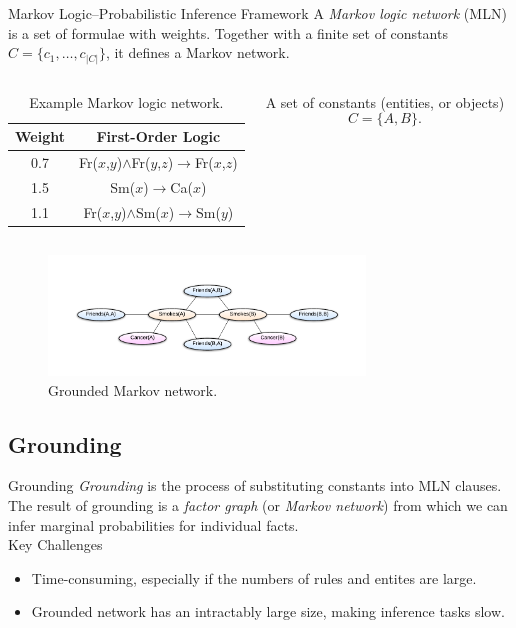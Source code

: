 \documentclass[onlymath,xcolor=pdftex,dvipsnames,table]{beamer}
\let\oldemph\emph
\renewcommand{\emph}[1]{{\color{Blue}\oldemph{#1}}}
\newcommand{\head}[1]{{\large\color{OliveGreen}#1\\[2pt]}}
\begin{document}
\begin{frame}{Markov Logic--Probabilistic Inference Framework}
A \emph{Markov logic network} (MLN) is a set of formulae with weights. Together with a finite set of constants $C=\{c_1,\ldots,c_{\left\vert C\right\vert}\}$, it defines a Markov network.

\begin{columns}[c]
  \begin{table}\tiny
    \centering
    \begin{tabular}{cc}\toprule
      \textbf{Weight} & \textbf{First-Order Logic}\\\midrule
      0.7 & Fr($x$,$y$)$\wedge$Fr($y$,$z$)$\rightarrow$Fr($x$,$z$)\\
      1.5 & Sm($x$)$\rightarrow$Ca($x$)\\
      1.1 & Fr($x$,$y$)$\wedge$Sm($x$)$\rightarrow$Sm($y$)\\
      \bottomrule
    \end{tabular}
    \caption{Example Markov logic network.}
    \label{tab:mln}
  \end{table}

  A set of constants (entities, or objects) $$C=\{A,B\}.$$
\end{columns}\vspace{-25pt}
\begin{figure}
  \centering
  \includegraphics[clip,trim=40 35 40 40,width=0.75\textwidth]{mrf.pdf}
  \caption{Grounded Markov network.}
  \label{fig:ground}
\end{figure}
\end{frame}


\subsection{Grounding}
\begin{frame}{Grounding}
\emph{Grounding} is the process of substituting constants into MLN clauses.\\[5pt]

The result of grounding is a \emph{factor graph} (or \emph{Markov network}) from which we can infer marginal probabilities for individual facts.\\[15pt]

\head{Key Challenges}
\begin{itemize}
  \item Time-consuming, especially if the numbers of rules and entites are large.
  \item Grounded network has an intractably large size, making inference tasks slow.
\end{itemize}
\end{frame}
\end{document}
